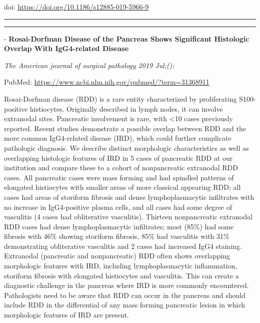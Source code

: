 \documentclass[]{article}
\begin{document}
doi: \url{https://doi.org/10.1186/s12885-019-5966-9}

{}

{}

\begin{center}\rule{0.5\linewidth}{\linethickness}\end{center}

\begin{center}\rule{0.5\linewidth}{\linethickness}\end{center}

 - \textbf{Rosai-Dorfman Disease of the Pancreas Shows Significant
Histologic Overlap With IgG4-related Disease}

\emph{The American journal of surgical pathology 2019 Jul;():}

PubMed: \url{https://www.ncbi.nlm.nih.gov/pubmed/?term=31368911}

Rosai-Dorfman disease (RDD) is a rare entity characterized by
proliferating S100-positive histiocytes. Originally described in lymph
nodes, it can involve extranodal sites. Pancreatic involvement is rare,
with \textless{}10 cases previously reported. Recent studies demonstrate
a possible overlap between RDD and the more common IgG4-related disease
(IRD), which could further complicate pathologic diagnosis. We describe
distinct morphologic characteristics as well as overlapping histologic
features of IRD in 5 cases of pancreatic RDD at our institution and
compare these to a cohort of nonpancreatic extranodal RDD cases. All
pancreatic cases were mass forming and had spindled patterns of
elongated histiocytes with smaller areas of more classical appearing
RDD; all cases had areas of storiform fibrosis and dense
lymphoplasmacytic infiltrates with no increase in IgG4-positive plasma
cells, and all cases had some degree of vasculitis (4 cases had
obliterative vasculitis). Thirteen nonpancreatic extranodal RDD cases
had dense lymphoplasmacytic infiltrates; most (85\%) had some fibrosis
with 46\% showing storiform fibrosis, 85\% had vasculitis with 31\%
demonstrating obliterative vasculitis and 2 cases had increased IgG4
staining. Extranodal (pancreatic and nonpancreatic) RDD often shows
overlapping morphologic features with IRD, including lymphoplasmacytic
inflammation, storiform fibrosis with elongated histiocytes and
vasculitis. This can create a diagnostic challenge in the pancreas where
IRD is more commonly encountered. Pathologists need to be aware that RDD
can occur in the pancreas and should include RDD in the differential of
any mass forming pancreatic lesion in which morphologic features of IRD
are present.
\end{document}
